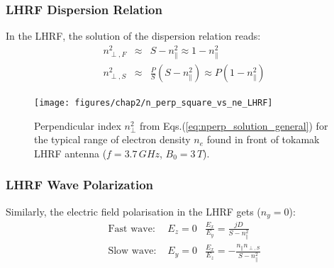 \subsubsection{LHRF Dispersion Relation}
In the LHRF, the solution of the dispersion relation reads:
\begin{subequations}
	\begin{eqnarray}
		n_{\perp,F}^2 &\approx& S - n_\parallel^2  \approx 1 - n_\parallel^2 \\
		\label{eq:n_perp_square_FW_LHRF}
		n_{\perp,S}^2 &\approx& \frac{P}{S} \left(S - n_\parallel^2\right) \approx P(1- n_\parallel^2)
		\label{eq:n_perp_square_SW_LHRF}
	\end{eqnarray}
	\label{eq:n_perp_square_LHRF}
\end{subequations}

\begin{figure}[h]
	\centering
	\texttt{[image: figures/chap2/n\_perp\_square\_vs\_ne\_LHRF]}
	\caption{Perpendicular index $n_\perp^2$ from Eqs.(\ref{eq:nperp_solution_general})   for the typical range of electron density $n_e$ found in front of tokamak LHRF antenna ($f=3.7\,\si{GHz}$, $B_0=3\,\si{T}$).}
	\label{fig:nperpsquarevsne_LHRF}
\end{figure}


\subsubsection{LHRF Wave Polarization}
Similarly, the electric field polarisation in the LHRF gets ($n_y=0$):
\begin{subequations}
	\begin{eqnarray}
	\mbox{Fast wave: } & E_z = 0 & \frac{E_x}{E_y}= \frac{j D}{S - n_\parallel^2} \\
	\mbox{Slow wave: } & E_y = 0 & \frac{E_x}{E_z}=- \frac{n_\parallel n_{\perp,S} }{S - n_\parallel^2}
	\end{eqnarray}
\end{subequations}

